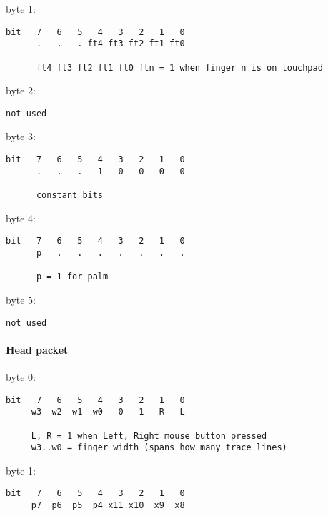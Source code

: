 \documentclass[a4paper,8pt,english]{sphinxmanual}
\begin{document}
byte 1:

\begin{Verbatim}[commandchars=\\\{\}]
bit   7   6   5   4   3   2   1   0
      .   .   . ft4 ft3 ft2 ft1 ft0

      ft4 ft3 ft2 ft1 ft0 ftn = 1 when finger n is on touchpad
\end{Verbatim}

byte 2:

\begin{Verbatim}[commandchars=\\\{\}]
not used
\end{Verbatim}

byte 3:

\begin{Verbatim}[commandchars=\\\{\}]
bit   7   6   5   4   3   2   1   0
      .   .   .   1   0   0   0   0

      constant bits
\end{Verbatim}

byte 4:

\begin{Verbatim}[commandchars=\\\{\}]
bit   7   6   5   4   3   2   1   0
      p   .   .   .   .   .   .   .

      p = 1 for palm
\end{Verbatim}

byte 5:

\begin{Verbatim}[commandchars=\\\{\}]
not used
\end{Verbatim}


\paragraph{Head packet}
\label{input/devices/elantech:head-packet}
byte 0:

\begin{Verbatim}[commandchars=\\\{\}]
bit   7   6   5   4   3   2   1   0
     w3  w2  w1  w0   0   1   R   L

     L, R = 1 when Left, Right mouse button pressed
     w3..w0 = finger width (spans how many trace lines)
\end{Verbatim}

byte 1:

\begin{Verbatim}[commandchars=\\\{\}]
bit   7   6   5   4   3   2   1   0
     p7  p6  p5  p4 x11 x10  x9  x8
\end{Verbatim}
\end{document}

